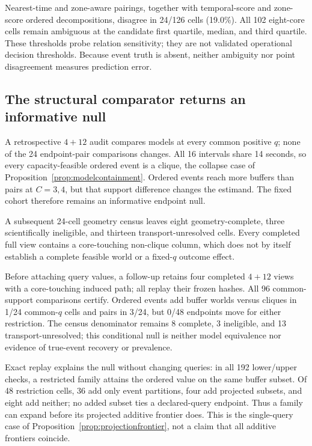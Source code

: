 Nearest-time and zone-aware pairings, together with temporal-score and
zone-score ordered decompositions, disagree in 24/126 cells (19.0\%).
All 102 eight-core cells remain ambiguous at the candidate first quartile,
median, and third quartile. These thresholds probe relation sensitivity;
they are not validated operational decision thresholds. Because event truth
is absent, neither ambiguity nor point disagreement measures prediction error.

\subsection{The structural comparator returns an informative null}
A retrospective $4+12$ audit compares models at every common positive $q$;
none of the 24 endpoint-pair comparisons changes. All 16 intervals share 14 seconds, so every
capacity-feasible ordered event is a clique, the collapse case of
Proposition~\ref{prop:modelcontainment}. Ordered events reach more buffers than
pairs at $C=3,4$, but that support difference changes the estimand. The fixed
cohort therefore remains an informative endpoint null.

A subsequent 24-cell geometry census leaves eight geometry-complete, three scientifically ineligible, and thirteen
transport-unresolved cells. Every completed full view contains a core-touching
non-clique column, which does not by itself establish a complete feasible world
or a fixed-$q$ outcome effect.

Before attaching query values, a follow-up retains four completed $4+12$ views
with a core-touching induced path; all replay their frozen hashes. All 96
common-support comparisons certify. Ordered events add buffer worlds versus
cliques in 1/24 common-$q$ cells and pairs in 3/24, but 0/48 endpoints move for
either restriction. The census denominator remains 8 complete, 3 ineligible,
and 13 transport-unresolved; this conditional null is neither model equivalence
nor evidence of true-event recovery or prevalence.

Exact replay explains the null without changing queries: in all 192 lower/upper
checks, a restricted family attains the ordered value on the same buffer subset.
Of 48 restriction cells, 36 add only event partitions, four add projected
subsets, and eight add neither; no added subset ties a declared-query endpoint.
Thus a family can expand before its projected additive frontier does. This is
the single-query case of Proposition~\ref{prop:projectionfrontier}, not a claim
that all additive frontiers coincide.

